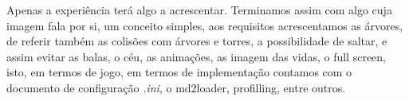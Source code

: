 Apenas a experiência terá algo a acrescentar. Terminamos assim com algo cuja imagem fala por si, um conceito simples, aos requisitos acrescentamos as árvores, de referir também as colisões com árvores e torres, a possibilidade de saltar, e assim evitar as balas, o céu, as animações, as imagem das vidas, o full screen, isto, em termos de jogo, em termos de implementação contamos com o documento de configuração \textit{.ini}, o md2loader, profilling, entre outros.